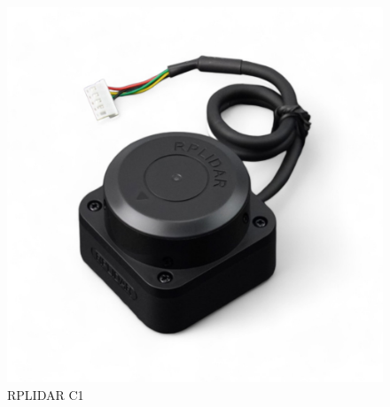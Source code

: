 {	\begin{figure}[H]
		\centering
		\includegraphics[scale=0.3]{images/Content/rplidar_c1}
		\caption{RPLIDAR C1}
		\label{fig:lidar}
	\end{figure}
}


